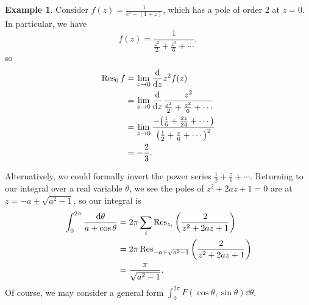 \documentclass[leqno, openany]{memoir}
\theoremstyle{definition}
\newtheorem{exm}[thm]{Example}
\theoremstyle{remark}
\theoremstyle{plain}
\theoremstyle{definition}
\theoremstyle{remark}
\begin{document}
\begin{exm}
    Consider $f(z) = \frac{1}{e^z - (1+z)}$, which has a pole of order $2$ at $z = 0$. In particular, we have
    \[ f(z) = \frac{1}{\frac{z^2}{2} + \frac{z^3}{6} + \cdots}, \]
    so 
    \begin{align*}
        \Res_0 f &= \lim_{z \to 0} \dv{z} z^2 f(z) \\
                 &= \lim_{z \to 0} \dv{z} \frac{z^2}{\frac{z^2}{2} + \frac{z^3}{6} + \cdots} \\
                 &= \lim_{z \to 0} \frac{- \qty(\frac{1}{6} + \frac{2z}{24} + \cdots)}{{\qty(\frac{1}{2} + \frac{z}{6} + \cdots)}^2} \\
                 &= - \frac{2}{3}.
    \end{align*}
\end{exm}

Alternatively, we could formally invert the power series $\frac{1}{2} + \frac{z}{6} + \cdots$. Returning to our integral over a real variable $\theta$, we see the poles of $z^2 + 2 az + 1 = 0$ are at $z = -a \pm \sqrt{a^2-1}$, so our integral is
\begin{align*}
    \int_0^{2 \pi} \frac{\dd{\theta}}{a + \cos \theta} &= 2 \pi \sum_{i} \Res_{z_i} \qty(\frac{2}{z^2 + 2az + 1}) \\
                                                       &= 2 \pi \Res_{-a+\sqrt{a^2-1}} \qty(\frac{2}{z^2 + 2az + 1}) \\
                                                       &= \frac{\pi}{\sqrt{a^2-1}}.
\end{align*}
Of course, we may consider a general form $\int_0^{2 \pi} F(\cos \theta, \sin \theta) \dd{\theta}$.
\end{document}
